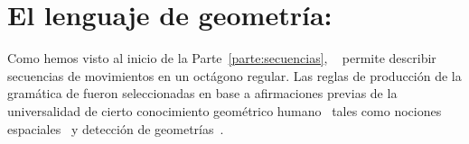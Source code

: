 \section{El lenguaje de geometría: \gramgeo}


Como hemos visto al inicio de la Parte~\ref{parte:secuencias}, \gramgeo~\cite{amalric2017language} permite describir secuencias de movimientos en un octágono regular. Las reglas de producción de la gramática de \gramgeo fueron seleccionadas en base a afirmaciones previas de la universalidad de cierto conocimiento geométrico humano~\cite{izard2011geometry,dehaene2006core,dillon2013core} tales como nociones espaciales~\cite{landau1981spatial,lee2012navigation} y detección de geometrías~\cite{westphal2012production,machilsen2009role}.


